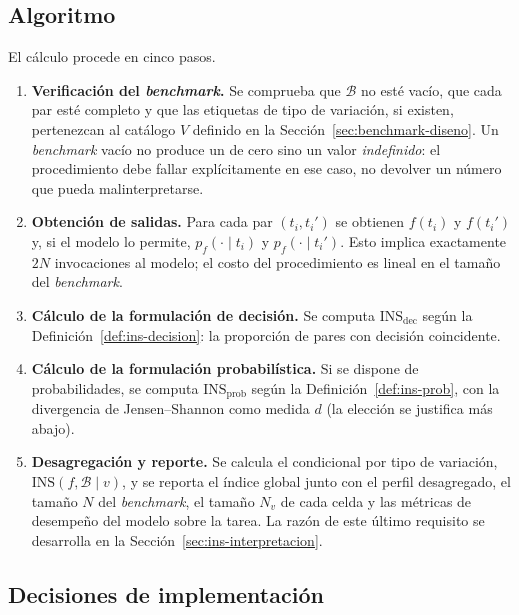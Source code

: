 \subsection{Algoritmo}

El cálculo procede en cinco pasos.

\begin{enumerate}
  \item \textbf{Verificación del \emph{benchmark}.} Se comprueba que
    $\mathcal{B}$ no esté vacío, que cada par esté completo y que las
    etiquetas de tipo de variación, si existen, pertenezcan al catálogo $V$
    definido en la Sección~\ref{sec:benchmark-diseno}. Un \emph{benchmark}
    vacío no produce un \INS de cero sino un valor \emph{indefinido}: el
    procedimiento debe fallar explícitamente en ese caso, no devolver un
    número que pueda malinterpretarse.
  \item \textbf{Obtención de salidas.} Para cada par $(t_i, t_i')$ se
    obtienen $f(t_i)$ y $f(t_i')$ y, si el modelo lo permite,
    $p_f(\cdot \mid t_i)$ y $p_f(\cdot \mid t_i')$. Esto implica exactamente
    $2N$ invocaciones al modelo; el costo del procedimiento es lineal en el
    tamaño del \emph{benchmark}.
  \item \textbf{Cálculo de la formulación de decisión.} Se computa
    $\mathrm{INS}_{\mathrm{dec}}$ según la Definición~\ref{def:ins-decision}:
    la proporción de pares con decisión coincidente.
  \item \textbf{Cálculo de la formulación probabilística.} Si se dispone de
    probabilidades, se computa $\mathrm{INS}_{\mathrm{prob}}$ según la
    Definición~\ref{def:ins-prob}, con la divergencia de Jensen--Shannon como
    medida $d$ (la elección se justifica más abajo).
  \item \textbf{Desagregación y reporte.} Se calcula el \INS condicional por
    tipo de variación, $\mathrm{INS}(f, \mathcal{B} \mid v)$, y se reporta el
    índice global junto con el perfil desagregado, el tamaño $N$ del
    \emph{benchmark}, el tamaño $N_v$ de cada celda y las métricas de
    desempeño del modelo sobre la tarea. La razón de este último requisito se
    desarrolla en la Sección~\ref{sec:ins-interpretacion}.
\end{enumerate}

\subsection{Decisiones de implementación}

